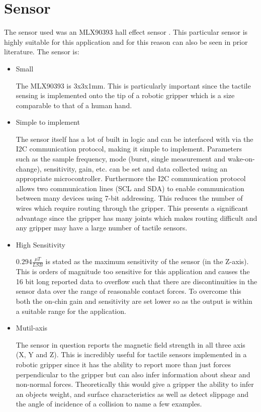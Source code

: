 \section{Sensor}
The sensor used was an MLX90393 hall effect sensor \cite{MLX}. This particular sensor is highly suitable for this application and for this reason can also be seen in prior literature. The sensor is:
\begin{itemize}
    \item Small
    
    The MLX90393 is 3x3x1mm. This is particularly important since the tactile sensing is implemented onto the tip of a robotic gripper which is a size comparable to that of a human hand.
    \item Simple to implement
    
    The sensor itself has a lot of built in logic and can be interfaced with via the I2C communication protocol, making it simple to implement. Parameters such as the sample frequency, mode (burst, single measurement and wake-on-change), sensitivity, gain, etc. can be set and data collected using an appropriate microcontroller. Furthermore the I2C communication protocol allows two communication lines (SCL and SDA) to enable communication between many devices using 7-bit addressing. This reduces the number of wires which require routing through the gripper. This presents a significant advantage since the gripper has many joints which makes routing difficult and any gripper may have a large number of tactile sensors.
    \item High Sensitivity
    
    $0.294 \frac{\mu T}{LSB}$ is stated as the maximum sensitivity of the sensor (in the Z-axis). This is orders of magnitude too sensitive for this application and causes the 16 bit long reported data to overflow such that there are discontinuities in the sensor data over the range of reasonable contact forces. To overcome this both the on-chin gain and sensitivity are set lower so as the output is within a suitable range for the application. 
    \item Mutil-axis
    
    The sensor in question reports the magnetic field strength in all three axis (X, Y and Z). This is incredibly useful for tactile sensors implemented in a robotic gripper since it has the ability to report more than just forces perpendicular to the gripper but can also infer information about shear and non-normal forces. Theoretically this would give a gripper the ability to infer an objects weight, and surface characteristics as well as detect slippage and the angle of incidence of a collision to name a few examples. 
    

\end{itemize}
